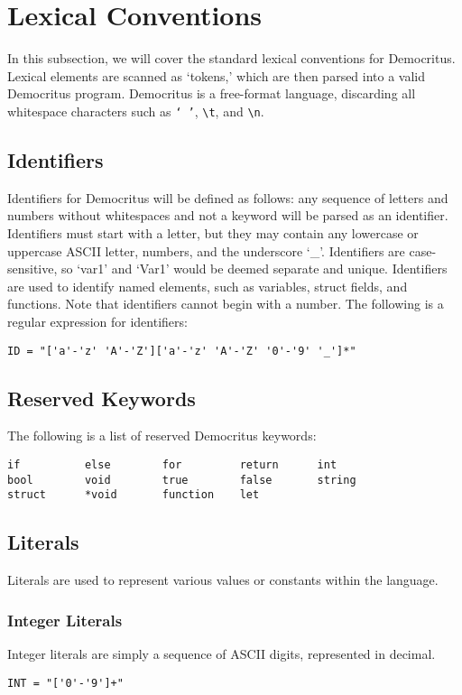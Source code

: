 \section{Lexical Conventions}
	In this subsection, we will cover the standard lexical conventions for Democritus. Lexical elements are scanned as `tokens,' which are then parsed into a valid Democritus program. Democritus is a free-format language, discarding all whitespace characters such as \texttt{` '}, \verb|\t|, and \verb|\n|.
	
	\subsection{Identifiers}
		Identifiers for Democritus will be defined as follows: any sequence of letters and numbers without whitespaces and not a keyword will be parsed as an identifier. Identifiers must start with a letter, but they may contain any lowercase or uppercase ASCII letter, numbers, and the underscore `\_'. Identifiers are case-sensitive, so `var1' and `Var1' would be deemed separate and unique. Identifiers are used to identify named elements, such as variables, struct fields, and functions. Note that identifiers cannot begin with a number. The following is a regular expression for identifiers:
		
		\begin{verbatim}
ID = "['a'-'z' 'A'-'Z']['a'-'z' 'A'-'Z' '0'-'9' '_']*"
		\end{verbatim}
	\subsection{Reserved Keywords}
		The following is a list of reserved Democritus keywords:
        \begin{verbatim}
if          else        for         return      int     
bool        void        true        false       string
struct      *void       function    let
        \end{verbatim}
	\subsection{Literals}
		Literals are used to represent various values or constants within the language.

        \subsubsection{Integer Literals}
            Integer literals are simply a sequence of ASCII digits, represented in decimal. 
	       \begin{verbatim}
INT = "['0'-'9']+"
	       \end{verbatim}

